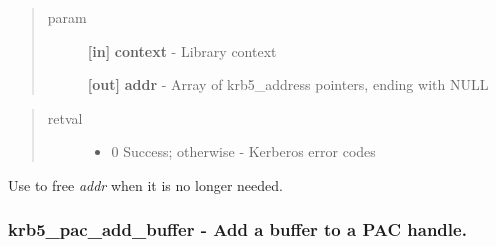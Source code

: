 \documentclass[letterpaper,10pt,english]{sphinxmanual}
\begin{document}
\begin{quote}\begin{description}
\item[{param}] \leavevmode
\textbf{{[}in{]}} \textbf{context} - Library context

\textbf{{[}out{]}} \textbf{addr} - Array of krb5\_address pointers, ending with NULL

\end{description}\end{quote}
\begin{quote}\begin{description}
\item[{retval}] \leavevmode\begin{itemize}
\item {} 
0   Success; otherwise - Kerberos error codes

\end{itemize}

\end{description}\end{quote}

Use {\hyperref[appdev/refs/api/krb5_free_addresses:c.krb5_free_addresses]{}} to free \emph{addr} when it is no longer needed.


\subsubsection{krb5\_pac\_add\_buffer -  Add a buffer to a PAC handle.}
\label{appdev/refs/api/krb5_pac_add_buffer:krb5-pac-add-buffer-add-a-buffer-to-a-pac-handle}\label{appdev/refs/api/krb5_pac_add_buffer::doc}

\begin{fulllineitems}
\label{appdev/refs/api/krb5_pac_add_buffer:c.krb5_pac_add_buffer}
\end{fulllineitems}
\end{document}
